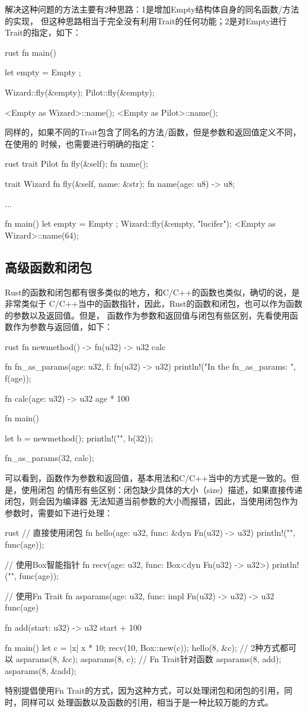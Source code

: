解决这种问题的方法主要有2种思路：1是增加Empty结构体自身的同名函数/方法的实现，
但这种思路相当于完全没有利用Trait的任何功能；2是对Empty进行Trait的指定，如下：
\begin{code-block}{rust}
fn main() {
    let empty = Empty {};

    Wizard::fly(&empty);
    Pilot::fly(&empty);

    <Empty as Wizard>::name();
    <Empty as Pilot>::name();
}
\end{code-block}
同样的，如果不同的Trait包含了同名的方法/函数，但是参数和返回值定义不同，在使用的
时候，也需要进行明确的指定：
\begin{code-block}{rust}
trait Pilot {
    fn fly(&self);
    fn name();
}

trait Wizard {
    fn fly(&self, name: &str);
    fn name(age: u8) -> u8;
}

...

fn main() {
    let empty = Empty {};
    Wizard::fly(&empty, "lucifer");
    <Empty as Wizard>::name(64);
}
\end{code-block}

\subsection{高级函数和闭包}
Rust的函数和闭包都有很多类似的地方，和C/C++的函数也类似，确切的说，是非常类似于
C/C++当中的函数指针，因此，Rust的函数和闭包，也可以作为函数的参数以及返回值。但是，
函数作为参数和返回值与闭包有些区别，先看使用函数作为参数与返回值，如下：
\begin{code-block}{rust}
fn newmethod() -> fn(u32) -> u32 {
    calc
}

fn fn_as_params(age: u32, f: fn(u32) -> u32) {
    println!("In the fn_as_params: {}", f(age));
}

fn calc(age: u32) -> u32 {
    age * 100
}

fn main() {
    let b = newmethod();
    println!("{}", b(32));

    fn_as_params(32, calc);
}
\end{code-block}
可以看到，函数作为参数和返回值，基本用法和C/C++当中的方式是一致的。但是，使用闭包
的情形有些区别：闭包缺少具体的大小（size）描述，如果直接传递闭包，则会因为编译器
无法知道当前参数的大小而报错，因此，当使用闭包作为参数时，需要如下进行处理：
\begin{code-block}{rust}
// 直接使用闭包
fn hello(age: u32, func: &dyn Fn(u32) -> u32) {
    println!("{}", func(age));
}

// 使用Box智能指针
fn recv(age: u32, func: Box<dyn Fn(u32) -> u32>) {
    println!("{}", func(age));
}

// 使用Fn Trait
fn asparams(age: u32, func: impl Fn(u32) -> u32) -> u32{
    func(age)
}

fn add(start: u32) -> u32 {
    start + 100
}

fn main() {
    let c = |x| x * 10;
    recv(10, Box::new(c));
    hello(8, &c);
    // 2种方式都可以
    asparams(8, &c);
    asparams(8, c);
    // Fn Trait针对函数
    asparams(8, add);
    asparams(8, &add);
}
\end{code-block}
特别提倡使用Fn Trait的方式，因为这种方式，可以处理闭包和闭包的引用，同时，同样可以
处理函数以及函数的引用，相当于是一种比较万能的方式。

